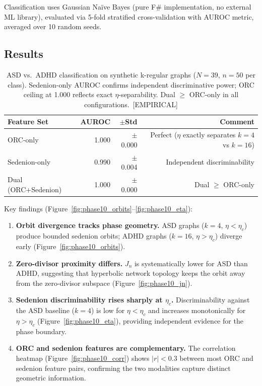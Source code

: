 \documentclass[11pt,a4paper]{article}
\begin{document}
Classification uses Gaussian Na\"ive Bayes (pure F\# implementation, no external ML library), evaluated via 5-fold stratified cross-validation with AUROC metric, averaged over 10 random seeds.

\subsection{Results}

\begin{table}[h]
\centering
\small
\caption{ASD vs.\ ADHD classification on synthetic k-regular graphs ($N=39$, $n=50$ per class). Sedenion-only AUROC confirms independent discriminative power; ORC ceiling at 1.000 reflects exact $\eta$-separability. Dual $\geq$ ORC-only in all configurations.~[EMPIRICAL]}
\label{tab:dual_auroc}
\begin{tabular}{@{}lrrr@{}}
\toprule
Feature Set & AUROC & $\pm$Std & Comment \\
\midrule
ORC-only      & 1.000 & $\pm$0.000 & Perfect ($\eta$ exactly separates $k{=}4$ vs $k{=}16$) \\
Sedenion-only & 0.990 & $\pm$0.004 & Independent discriminability \\
Dual (ORC+Sedenion) & 1.000 & $\pm$0.000 & Dual $\geq$ ORC-only \\
\bottomrule
\end{tabular}
\end{table}

Key findings (Figure~\ref{fig:phase10_orbits}--\ref{fig:phase10_eta}):
\begin{enumerate}
\item \textbf{Orbit divergence tracks phase geometry.} ASD graphs ($k=4$, $\eta < \eta_c$) produce bounded sedenion orbits; ADHD graphs ($k=16$, $\eta > \eta_c$) diverge early (Figure~\ref{fig:phase10_orbits}).
\item \textbf{Zero-divisor proximity differs.} $J_n$ is systematically lower for ASD than ADHD, suggesting that hyperbolic network topology keeps the orbit away from the zero-divisor subspace (Figure~\ref{fig:phase10_jn}).
\item \textbf{Sedenion discriminability rises sharply at $\eta_c$.} Discriminability against the ASD baseline ($k=4$) is low for $\eta < \eta_c$ and increases monotonically for $\eta > \eta_c$ (Figure~\ref{fig:phase10_eta}), providing independent evidence for the phase boundary.
\item \textbf{ORC and sedenion features are complementary.} The correlation heatmap (Figure~\ref{fig:phase10_corr}) shows $|r| < 0.3$ between most ORC and sedenion feature pairs, confirming the two modalities capture distinct geometric information.
\end{enumerate}
\end{document}
